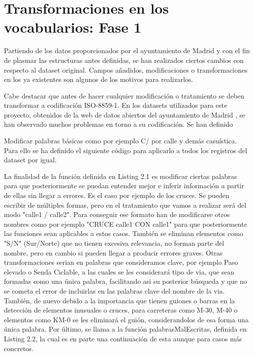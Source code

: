 
\section{Transformaciones en los vocabularios: Fase 1}

Partiendo de los datos proporcionados por el ayuntamiento de Madrid y con el fin de plasmar las estructuras antes definidas, se han realizados ciertos cambios con respecto al dataset original. Campos añadidos, modificaciones o transformaciones en los ya existentes son algunos de los motivos para realizarlos.\newline

Cabe destacar que antes de hacer cualquier modificación o tratamiento se deben transformar a codificación ISO-8859-1. En los datasets utilizados para este proyecto, obtenidos de la web de datos abiertos del ayuntamiento de Madrid \cite{datosabiertos_ayuntmadrid}, se han observado muchos problemas en torno a su codificación.\newline
\newline
Se han definido


Modificar palabras básicas como por ejemplo C/ por calle y demás casuística. Para ello se ha definido el siguiente código para aplicarlo a todos los registros del dataset por igual.





La finalidad de la función definida en Listing 2.1 es modificar ciertas palabras para que posteriormente se puedan entender mejor e inferir información a partir de ellas sin llegar a errores.
\newline
Es el caso por ejemplo de los cruces. Se pueden escribir de múltiples formas, pero en el tratamiento que vamos a realizar será del modo "calle1 / calle2". Para conseguir ese formato han de modificarse otros nombres como por ejemplo "CRUCE calle1 CON calle1" para que posteriormente las funciones sean aplicables a estos casos.
\newline
También se eliminan elementos como "S/N" (Sur/Norte) que no tienen excesiva relevancia, no forman parte del nombre, pero en cambio si pueden llegar a producir errores graves.
\newline
Otras transformaciones serian en palabras que consideramos clave, por ejemplo Paso elevado o Senda Ciclable, a las cuales se les considerará tipo de via, que sean formadas como una única palabra, facilitando asi su posterior búsqueda y que no se cometa el error de incluirlas en las palabras clave del nombre de la via.
\newline
También, de nuevo debido a la importancia que tienen guiones o barras en la detección de elementos inusuales o cruces, para carreteras como M-30, M-40 o elementos como KM-0 se les eliminará el guión, considerandolos de esa forma una única palabra.
\newline
Por último, se llama a la función palabrasMalEscritas, definida en Listing 2.2, la cual es en parte una continuación de esta aunque para casos más concretos.

